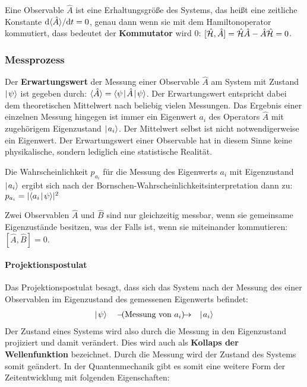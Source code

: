 Eine Observable $\hat{A}$ ist eine Erhaltungsgröße des Systems, das heißt eine zeitliche Konstante $\mathrm{d}\langle\!\!\,\,\hat{A}\!\!\,\,\rangle/\mathrm{d}t=0$, genau dann wenn sie mit dem Hamiltonoperator kommutiert, dass bedeutet der {\bf Kommutator} wird 0: $[\hat{\mathcal H},\hat{A}]=\hat{\mathcal H}\hat{A}-\hat{A}\hat{\mathcal H}=0$. 


\subsubsection{Messprozess}

Der {\bf Erwartungswert} der Messung einer Observable $\hat{A}$ am System mit Zustand $\mid\!\!\!\,\,{\psi}\rangle$ ist gegeben durch: $\EW{\hat{A}}=\bracket{\psi}{\hat{A}}{\psi}$. Der Erwartungswert entspricht dabei dem theoretischen Mittelwert nach beliebig vielen Messungen. Das Ergebnis einer einzelnen Messung hingegen ist immer ein Eigenwert $a_i$ des Operators $\hat{A}$ mit zugehörigem Eigenzustand $\mid\!\!\!\,\,{a_i}\rangle$. Der Mittelwert selbst ist nicht notwendigerweise ein Eigenwert. Der Erwartungswert einer Observable hat in diesem Sinne keine physikalische, sondern lediglich eine statistische Realität. 

Die Wahrscheinlichkeit $p_{a_i}$ für die Messung des Eigenwerts $a_i$ mit Eigenzustand $\mid\!\!\!\,\,{a_i}\rangle$ ergibt sich nach der Bornschen-Wahrscheinlichkeitsinterpretation dann zu: $p_{a_i}=|\langle{a_i}\!\!\!\,\,\mid\!\!\!\,\,{\psi}\rangle|^2$

Zwei Observablen $\hat{A}$ und $\hat{B}$ sind nur gleichzeitig messbar, wenn sie gemeinsame Eigenzustände besitzen, was der Falls ist, wenn sie miteinander kommutieren: $[\hat{A},\hat{B}]=0$. 

\paragraph{Projektionspostulat}

Das Projektionspostulat besagt, dass sich das System nach der Messung des einer Observablen im Eigenzustand des gemessenen Eigenwerts befindet: 
\begin{eqnarray*}
	\ket{\psi} \quad\arrowbox{Messung von $a_i$}\quad \ket{a_i}
\end{eqnarray*}
Der Zustand eines Systems wird also durch die Messung in den Eigenzustand projiziert und damit verändert. Dies wird auch als {\bf Kollaps der Wellenfunktion} bezeichnet. Durch die Messung wird der Zustand des Systems somit geändert. In der Quantenmechanik gibt es somit eine weitere Form der Zeitentwicklung mit folgenden Eigenschaften: 

